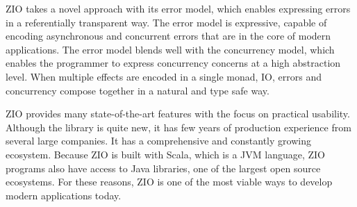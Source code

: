 ZIO takes a novel approach with its error model, which enables expressing errors in a referentially transparent way. The error model is expressive, capable of encoding asynchronous and concurrent errors that are in the core of modern applications. The error model blends well with the concurrency model, which enables the programmer to express concurrency concerns at a high abstraction level. When multiple effects are encoded in a single monad, IO, errors and concurrency compose together in a natural and type safe way.

ZIO provides many state-of-the-art features with the focus on practical usability. Although the library is quite new, it has few years of production experience from several large companies. It has a comprehensive and constantly growing ecosystem. Because ZIO is built with Scala, which is a JVM language, ZIO programs also have access to Java libraries, one of the largest open source ecosystems. For these reasons, ZIO is one of the most viable ways to develop modern applications today.
